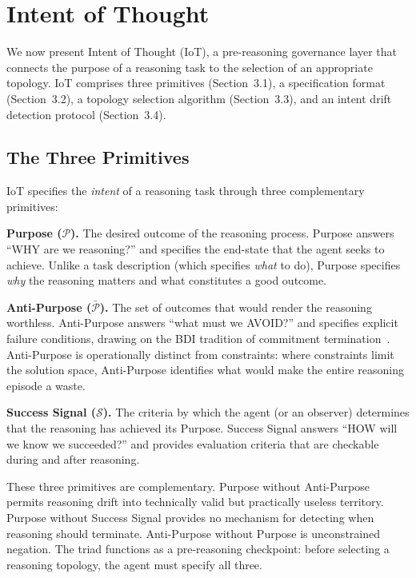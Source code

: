\documentclass[11pt,a4paper]{article}
\begin{document}
\section{Intent of Thought}

We now present Intent of Thought (IoT), a pre-reasoning governance layer that connects the purpose of a reasoning task to the selection of an appropriate topology. IoT comprises three primitives (Section~3.1), a specification format (Section~3.2), a topology selection algorithm (Section~3.3), and an intent drift detection protocol (Section~3.4).

\subsection{The Three Primitives}

IoT specifies the \emph{intent} of a reasoning task through three complementary primitives:

\textbf{Purpose ($\mathcal{P}$).} The desired outcome of the reasoning process. Purpose answers ``WHY are we reasoning?'' and specifies the end-state that the agent seeks to achieve. Unlike a task description (which specifies \emph{what} to do), Purpose specifies \emph{why} the reasoning matters and what constitutes a good outcome.

\textbf{Anti-Purpose ($\bar{\mathcal{P}}$).} The set of outcomes that would render the reasoning worthless. Anti-Purpose answers ``what must we AVOID?'' and specifies explicit failure conditions, drawing on the BDI tradition of commitment termination~\citep{cohen1990intention}. Anti-Purpose is operationally distinct from constraints: where constraints limit the solution space, Anti-Purpose identifies what would make the entire reasoning episode a waste.

\textbf{Success Signal ($\mathcal{S}$).} The criteria by which the agent (or an observer) determines that the reasoning has achieved its Purpose. Success Signal answers ``HOW will we know we succeeded?'' and provides evaluation criteria that are checkable during and after reasoning.

These three primitives are complementary. Purpose without Anti-Purpose permits reasoning drift into technically valid but practically useless territory. Purpose without Success Signal provides no mechanism for detecting when reasoning should terminate. Anti-Purpose without Purpose is unconstrained negation. The triad functions as a pre-reasoning checkpoint: before selecting a reasoning topology, the agent must specify all three.
\end{document}
